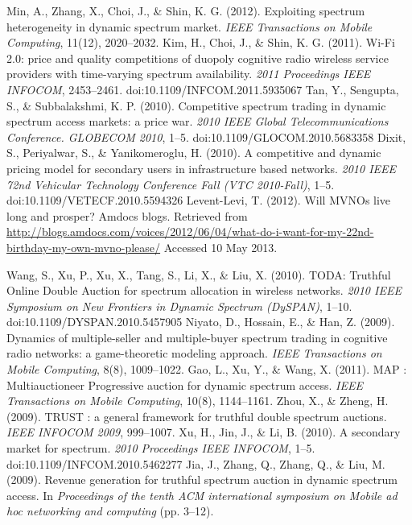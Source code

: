 \begin{thebibliography}{}
 Min, A., Zhang, X., Choi, J., \& Shin, K. G. (2012). Exploiting spectrum heterogeneity in dynamic spectrum market.\textit{ IEEE Transactions on Mobile Computing}, 11(12), 2020–2032.
 Kim, H., Choi, J., \& Shin, K. G. (2011). Wi-Fi 2.0: price and quality competitions of duopoly cognitive radio wireless service providers with time-varying spectrum availability. \textit{2011 Proceedings IEEE INFOCOM}, 2453–2461. doi:10.1109/INFCOM.2011.5935067
 Tan, Y., Sengupta, S., \& Subbalakshmi, K. P. (2010). Competitive spectrum trading in dynamic spectrum access markets: a price war. \textit{2010 IEEE Global Telecommunications Conference. GLOBECOM 2010}, 1–5. doi:10.1109/GLOCOM.2010.5683358
 Dixit, S., Periyalwar, S., \& Yanikomeroglu, H. (2010). A competitive and dynamic pricing model for secondary users in infrastructure based networks. \textit{2010 IEEE 72nd Vehicular Technology Conference Fall (VTC 2010-Fall)}, 1–5. doi:10.1109/VETECF.2010.5594326
 Levent-Levi, T. (2012). Will MVNOs live long and prosper? Amdocs blogs. Retrieved from \url{http://blogs.amdocs.com/voices/2012/06/04/what-do-i-want-for-my-22nd-birthday-my-own-mvno-please/} Accessed 10 May 2013. 

 Wang, S., Xu, P., Xu, X., Tang, S., Li, X., \& Liu, X. (2010). TODA: Truthful Online Double Auction for spectrum allocation in wireless networks. \textit{2010 IEEE Symposium on New Frontiers in Dynamic Spectrum (DySPAN)}, 1–10. doi:10.1109/DYSPAN.2010.5457905
 Niyato, D., Hossain, E., \& Han, Z. (2009). Dynamics of multiple-seller and multiple-buyer spectrum trading in cognitive radio networks: a game-theoretic modeling approach. \textit{IEEE Transactions on Mobile Computing}, 8(8), 1009–1022.
 Gao, L., Xu, Y., \& Wang, X. (2011). MAP : Multiauctioneer Progressive auction for dynamic spectrum access. \textit{IEEE Transactions on Mobile Computing}, 10(8), 1144–1161.	
 Zhou, X., \& Zheng, H. (2009). TRUST : a general framework for truthful double spectrum auctions. \textit{IEEE INFOCOM 2009}, 999–1007.	
 Xu, H., Jin, J., \& Li, B. (2010). A secondary market for spectrum.\textit{ 2010 Proceedings IEEE INFOCOM}, 1–5. doi:10.1109/INFCOM.2010.5462277
 Jia, J., Zhang, Q., Zhang, Q., \& Liu, M. (2009). Revenue generation for truthful spectrum auction in dynamic spectrum access. In \textit{Proceedings of the tenth ACM international symposium on Mobile ad hoc networking and computing} (pp. 3–12).	


\end{thebibliography}
